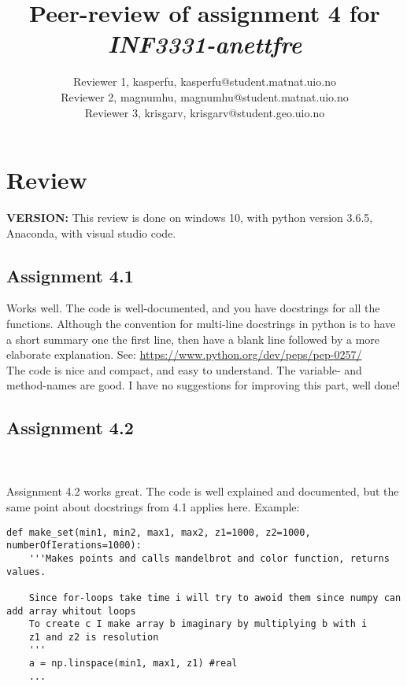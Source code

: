 \documentclass[a4paper]{article}
\title{Peer-review of assignment 4 for \textit{INF3331-anettfre}}
\author{Reviewer 1, kasperfu, {kasperfu@student.matnat.uio.no}  \\
 		 Reviewer 2, magnumhu, {magnumhu@student.matnat.uio.no} \\
		 Reviewer 3, krisgarv, {krisgarv@student.geo.uio.no}}
\begin{document}
\maketitle


\section{Review }\label{sec:review}

\textbf{VERSION:} This review is done on windows 10, with python version 3.6.5, Anaconda, with visual studio code.

\subsection*{Assignment 4.1}
\text Works well. The code is well-documented, and you have docstrings for 
all the functions. Although the convention for multi-line docstrings in python 
is to have a short summary one the first line, then have a blank line followed 
by a more elaborate explanation. See: \href{https://www.python.org/dev/peps/pep-0257/}{https://www.python.org/dev/peps/pep-0257/} \\
\text The code is nice and compact, and easy to understand. The variable- and method-names are good. I have no suggestions for improving this part, well done!



\subsection*{Assignment 4.2} \label{sec:assignment5.2}
\text \\\\Assignment 4.2 works great. The code is well explained and documented, but the same point about docstrings from 4.1 applies here. Example:

\begin{verbatim}
def make_set(min1, min2, max1, max2, z1=1000, z2=1000, numberOfIerations=1000):
    '''Makes points and calls mandelbrot and color function, returns values.
    
    Since for-loops take time i will try to awoid them since numpy can add array whitout loops
    To create c I make array b imaginary by multiplying b with i
    z1 and z2 is resolution
    '''
    a = np.linspace(min1, max1, z1) #real
    ...
\end{verbatim}
\end{document}
